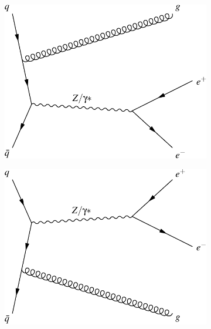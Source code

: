 \begin{figure}[!p]
    \centering
    \begin{subfigure}[b]{\SideBySidePlotWidth}
        \includegraphics[width=\linewidth]{figures/feyn_qqbar_to_zg.pdf}
        \caption{}
        \label{fig:feyn_qqbar_to_zg}
    \end{subfigure}%
    \begin{subfigure}[b]{\SideBySidePlotWidth}
        \includegraphics[width=\linewidth]{figures/feyn_qbarq_to_zg.pdf}
        \caption{}
        \label{fig:feyn_qbarq_to_zg}
    \end{subfigure}
    \begin{subfigure}[b]{\SideBySidePlotWidth}

\end{subfigure}
\end{figure}
